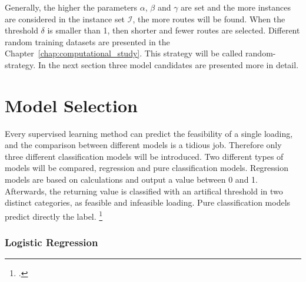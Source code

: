 Generally, the higher the parameters $\alpha$, $\beta$ and $\gamma$ are set and the more instances
are considered in the instance set $\mathcal{I}$, the more routes will be found. When the threshold $\delta$
is smaller than 1, then shorter and fewer routes are selected. Different
random training datasets are presented in the Chapter~\ref{chap:computational_study}.
This strategy will be called random-strategy. In the next section three model candidates
are presented more in detail.

\section{Model Selection}
\label{sec:modelselection}
Every supervised learning method can predict the feasibility of a single loading, and the comparison
between different models is a tidious job. Therefore only three different classification
models will be introduced.
Two different types of models will be compared, regression and pure classification models. Regression
models are based on calculations and output a value between 0 and 1. Afterwards, the returning value is classified with
an artifical threshold in two distinct categories, as feasible and infeasible loading. Pure classification
models predict directly the label. \footcite[cf.][p. 5]{nasteski_overview_2017}

\subsubsection{Logistic Regression}

